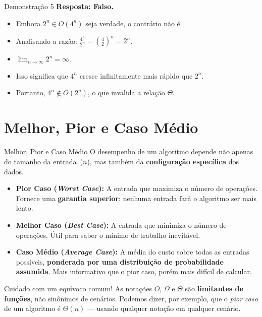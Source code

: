 \documentclass[aspectratio=169]{beamer}
\begin{document}
\begin{frame}{Demonstração 5}
    \textbf{Resposta: Falso.}
    \begin{itemize}
        \item Embora $2^n \in O(4^n)$ seja verdade, o contrário não é.
        \item Analisando a razão: $\frac{4^n}{2^n} = \left(\frac{4}{2}\right)^n = 2^n$.
        \item $\lim_{n \to \infty} 2^n = \infty$.
        \item Isso significa que $4^n$ cresce infinitamente mais rápido que $2^n$.
        \item Portanto, $4^n \notin O(2^n)$, o que invalida a relação $\Theta$.
    \end{itemize}
\end{frame}

\section{Melhor, Pior e Caso Médio}
\begin{frame}[shrink]{ Melhor, Pior e Caso Médio}
    O desempenho de um algoritmo depende não apenas do tamanho da entrada~($n$),
    mas também da \textbf{configuração específica} dos dados.

    \begin{itemize}
        \item \textbf{Pior Caso (\emph{Worst Case}):}
              A entrada que maximiza o número de operações.
              Fornece uma \textbf{garantia superior}: nenhuma entrada fará o algoritmo ser mais lento.

        \item \textbf{Melhor Caso (\emph{Best Case}):}
              A entrada que minimiza o número de operações.
              Útil para saber o mínimo de trabalho inevitável.

        \item \textbf{Caso Médio (\emph{Average Case}):}
              A média do custo sobre todas as entradas possíveis,
              \textbf{ponderada por uma distribuição de probabilidade assumida}.
              Mais informativo que o pior caso, porém mais difícil de calcular.
    \end{itemize}

    \medskip
    \begin{alertblock}{Cuidado com um equívoco comum!}
        As notações $O$, $\Omega$ e $\Theta$ são \textbf{limitantes de funções},
        não sinônimos de cenários.
        Podemos dizer, por exemplo, que o \emph{pior caso} de um algoritmo é $\Theta(n)$
        --- usando qualquer notação em qualquer cenário.
    \end{alertblock}
\end{frame}
\end{document}
